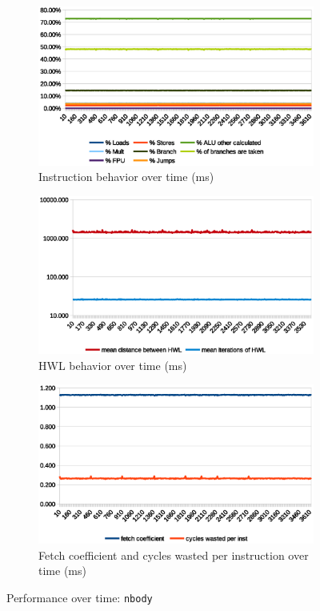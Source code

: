 \documentclass[../bachelor_paper.tex]{subfiles}
\begin{document}
\begin{figure}
    \begin{subfigure}{0.45\textwidth}
        \includegraphics[width=\textwidth]{img/graph/embench/nbody_inst.eps}
        \caption{Instruction behavior over time (ms)}
    \end{subfigure}
    \begin{subfigure}{0.45\textwidth}
        \includegraphics[width=\textwidth]{img/graph/embench/nbody_hwl.eps}
        \caption{\ac{HWL} behavior over time (ms)}
    \end{subfigure}
    \begin{subfigure}{0.45\textwidth}
        \includegraphics[width=\textwidth]{img/graph/embench/nbody_fetch_waste.eps}
        \caption{Fetch coefficient and cycles wasted per instruction over time (ms)}
    \end{subfigure}
    \caption{Performance over time: \texttt{nbody}}
\end{figure}
\end{document}
